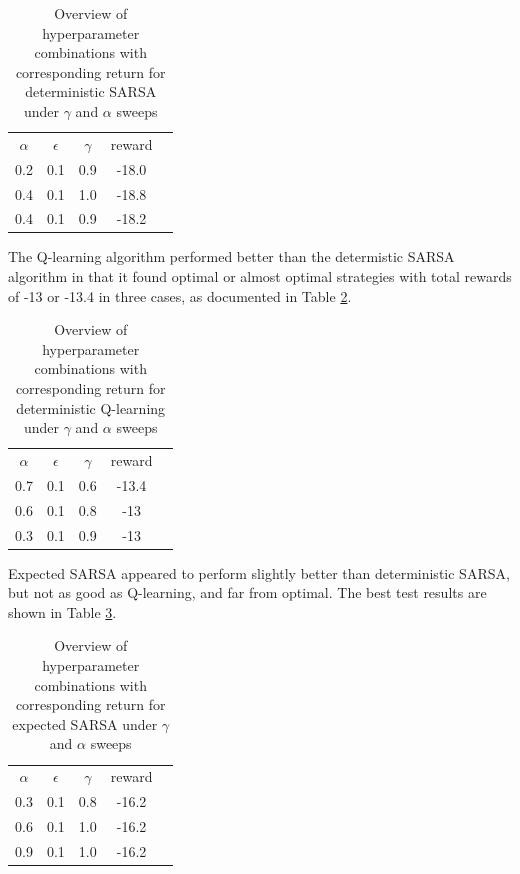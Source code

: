 \begin{table}[H]
\begin{centering}
	\begin{tabular}{ccccc}
	$\alpha$ & $\epsilon$ & $\gamma$ & reward &  \\
	0.2   & 0.1   & 0.9   & -18.0     &  \\
	0.4   & 0.1   & 1.0   & -18.8     &  \\
	0.4   & 0.1   & 0.9   & -18.2     & 
	\end{tabular}
    \caption{Overview of hyperparameter combinations with corresponding return for deterministic SARSA 				under $\gamma$ and $\alpha$ sweeps}
    \label{table:deterministic_sarsa_results_gamma_sweep}
\end{centering}
\end{table}

The Q-learning algorithm performed better than the determistic SARSA algorithm in that it found optimal or almost optimal strategies with total rewards of -13 or -13.4 in three cases, as documented in Table \ref{table:deterministic_Q_results_gamma_sweep}.


\begin{table}[H]
\begin{centering}
	\begin{tabular}{ccccc}
	$\alpha$ & $\epsilon$ & $\gamma$ & reward &  \\
	0.7   & 0.1   & 0.6   & -13.4     &  \\
	0.6   & 0.1   & 0.8   & -13     &  \\
	0.3   & 0.1   & 0.9   & -13     & 
	\end{tabular}
    \caption{Overview of hyperparameter combinations with corresponding return for deterministic Q-learning under $\gamma$ and $\alpha$ sweeps}
    \label{table:deterministic_Q_results_gamma_sweep}
\end{centering}
\end{table}

Expected SARSA appeared to perform slightly better than deterministic SARSA, but not as good as Q-learning, and far from optimal. The best test results are shown in Table \ref{table:expected_sarsa_results_gamma_sweep}.

\begin{table}[H]
\begin{centering}
	\begin{tabular}{ccccc}
	$\alpha$ & $\epsilon$ & $\gamma$ & reward &  \\
	0.3   & 0.1   & 0.8   & -16.2     &  \\
	0.6   & 0.1   & 1.0   & -16.2     &  \\
	0.9   & 0.1   & 1.0   & -16.2     & 
	\end{tabular}
    \caption{Overview of hyperparameter combinations with corresponding return for expected SARSA 				under $\gamma$ and $\alpha$ sweeps}
    \label{table:expected_sarsa_results_gamma_sweep}
\end{centering}
\end{table}


